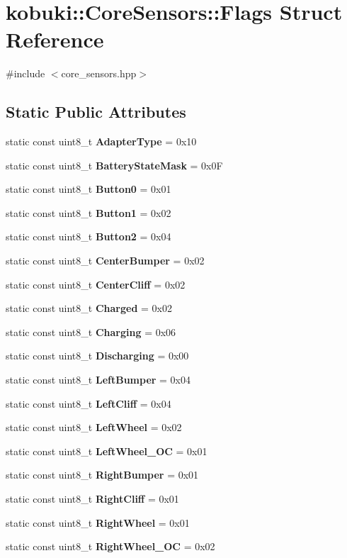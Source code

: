 \section{kobuki\-:\-:\-Core\-Sensors\-:\-:\-Flags \-Struct \-Reference}
\label{structkobuki_1_1CoreSensors_1_1Flags}


{\ttfamily \#include $<$core\-\_\-sensors.\-hpp$>$}

\subsection*{\-Static \-Public \-Attributes}
\begin{DoxyCompactItemize}
\item 
static const uint8\-\_\-t {\bf \-Adapter\-Type} = 0x10
\item 
static const uint8\-\_\-t {\bf \-Battery\-State\-Mask} = 0x0\-F
\item 
static const uint8\-\_\-t {\bf \-Button0} = 0x01
\item 
static const uint8\-\_\-t {\bf \-Button1} = 0x02
\item 
static const uint8\-\_\-t {\bf \-Button2} = 0x04
\item 
static const uint8\-\_\-t {\bf \-Center\-Bumper} = 0x02
\item 
static const uint8\-\_\-t {\bf \-Center\-Cliff} = 0x02
\item 
static const uint8\-\_\-t {\bf \-Charged} = 0x02
\item 
static const uint8\-\_\-t {\bf \-Charging} = 0x06
\item 
static const uint8\-\_\-t {\bf \-Discharging} = 0x00
\item 
static const uint8\-\_\-t {\bf \-Left\-Bumper} = 0x04
\item 
static const uint8\-\_\-t {\bf \-Left\-Cliff} = 0x04
\item 
static const uint8\-\_\-t {\bf \-Left\-Wheel} = 0x02
\item 
static const uint8\-\_\-t {\bf \-Left\-Wheel\-\_\-\-O\-C} = 0x01
\item 
static const uint8\-\_\-t {\bf \-Right\-Bumper} = 0x01
\item 
static const uint8\-\_\-t {\bf \-Right\-Cliff} = 0x01
\item 
static const uint8\-\_\-t {\bf \-Right\-Wheel} = 0x01
\item 
static const uint8\-\_\-t {\bf \-Right\-Wheel\-\_\-\-O\-C} = 0x02
\end{DoxyCompactItemize}


